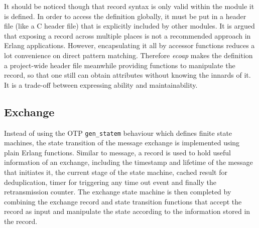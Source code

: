 
It should be noticed though that record syntax is only valid within the module it is defined. In order to access the definition globally, it must be put in a header file (like a C header file) that is explicitly included by other modules. It is argued that exposing a record across multiple places is not a recommended approach in Erlang applications. However, encapsulating it all by accessor functions reduces a lot convenience on direct pattern matching. Therefore \textit{ecoap} makes the definition a project-wide header file meanwhile providing functions to manipulate the record, so that one still can obtain attributes without knowing the innards of it. It is a trade-off between expressing ability and maintainability. 

\subsection{Exchange}\label{exchange_implementation}

Instead of using the OTP \verb|gen_statem| behaviour which defines finite state machines, the state transition of the message exchange is implemented using plain Erlang functions. Similar to message, a record is used to hold useful information of an exchange, including the timestamp and lifetime of the message that initiates it, the current stage of the state machine, cached result for deduplication, timer for triggering any time out event and finally the retransmission counter. The exchange state machine is then completed by combining the exchange record and state transition functions that accept the record as input and manipulate the state according to the information stored in the record.

